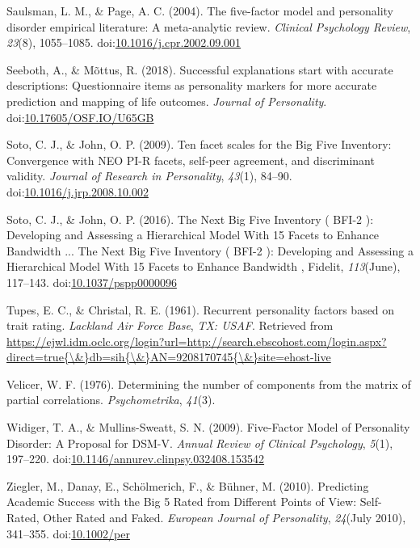 \documentclass[man]{apa6}
\theoremstyle{definition}
\theoremstyle{definition}
\theoremstyle{definition}
\theoremstyle{remark}
\begin{document}
\leavevmode\hypertarget{ref-SaulsmanPage2004}{}%
Saulsman, L. M., \& Page, A. C. (2004). The five-factor model and
personality disorder empirical literature: A meta-analytic review.
\emph{Clinical Psychology Review}, \emph{23}(8), 1055--1085.
doi:\href{https://doi.org/10.1016/j.cpr.2002.09.001}{10.1016/j.cpr.2002.09.001}

\leavevmode\hypertarget{ref-Seeboth2018}{}%
Seeboth, A., \& Mõttus, R. (2018). Successful explanations start with
accurate descriptions: Questionnaire items as personality markers for
more accurate prediction and mapping of life outcomes. \emph{Journal of
Personality}.
doi:\href{https://doi.org/10.17605/OSF.IO/U65GB}{10.17605/OSF.IO/U65GB}

\leavevmode\hypertarget{ref-SotoJohn2009}{}%
Soto, C. J., \& John, O. P. (2009). Ten facet scales for the Big Five
Inventory: Convergence with NEO PI-R facets, self-peer agreement, and
discriminant validity. \emph{Journal of Research in Personality},
\emph{43}(1), 84--90.
doi:\href{https://doi.org/10.1016/j.jrp.2008.10.002}{10.1016/j.jrp.2008.10.002}

\leavevmode\hypertarget{ref-SotoJohn2016}{}%
Soto, C. J., \& John, O. P. (2016). The Next Big Five Inventory ( BFI-2
): Developing and Assessing a Hierarchical Model With 15 Facets to
Enhance Bandwidth ... The Next Big Five Inventory ( BFI-2 ): Developing
and Assessing a Hierarchical Model With 15 Facets to Enhance Bandwidth ,
Fidelit, \emph{113}(June), 117--143.
doi:\href{https://doi.org/10.1037/pspp0000096}{10.1037/pspp0000096}

\leavevmode\hypertarget{ref-TupesChristal1961}{}%
Tupes, E. C., \& Christal, R. E. (1961). Recurrent personality factors
based on trait rating. \emph{Lackland Air Force Base}, \emph{TX: USAF}.
Retrieved from
\href{https://ejwl.idm.oclc.org/login?url=http://search.ebscohost.com/login.aspx?direct=true\%7B/\&\%7Ddb=sih\%7B/\&\%7DAN=9208170745\%7B/\&\%7Dsite=ehost-live}{https://ejwl.idm.oclc.org/login?url=http://search.ebscohost.com/login.aspx?direct=true\{\textbackslash{}\&\}db=sih\{\textbackslash{}\&\}AN=9208170745\{\textbackslash{}\&\}site=ehost-live}

\leavevmode\hypertarget{ref-Velicer1976}{}%
Velicer, W. F. (1976). Determining the number of components from the
matrix of partial correlations. \emph{Psychometrika}, \emph{41}(3).

\leavevmode\hypertarget{ref-WidigerMullins2009}{}%
Widiger, T. A., \& Mullins-Sweatt, S. N. (2009). Five-Factor Model of
Personality Disorder: A Proposal for DSM-V. \emph{Annual Review of
Clinical Psychology}, \emph{5}(1), 197--220.
doi:\href{https://doi.org/10.1146/annurev.clinpsy.032408.153542}{10.1146/annurev.clinpsy.032408.153542}

\leavevmode\hypertarget{ref-Ziegler2010}{}%
Ziegler, M., Danay, E., Schölmerich, F., \& Bühner, M. (2010).
Predicting Academic Success with the Big 5 Rated from Different Points
of View: Self-Rated, Other Rated and Faked. \emph{European Journal of
Personality}, \emph{24}(July 2010), 341--355.
doi:\href{https://doi.org/10.1002/per}{10.1002/per}

\endgroup


\clearpage
\renewcommand{\listtablename}{Table captions}
\listoftables
\end{document}

